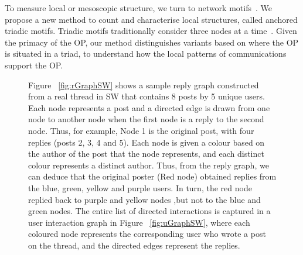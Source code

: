 To measure local or mesoscopic structure, we turn to network motifs~\cite{milo2002network}. We propose a new method to count and characterise local structures, called anchored triadic motifs. Triadic motifs traditionally consider three nodes at a time~\cite{milo2002network}. Given the primacy of the OP, our method distinguishes variants based on where the OP is situated in a triad, to understand how the local patterns of  communications support the OP.  

\begin{figure}[!h]
    \centering
\hspace{30mm}
    
    \caption{ Figure ~\ref{fig:rGraphSW} shows a sample reply graph constructed from a real thread in SW that contains 8 posts by 5 unique users. Each node represents a post and a directed edge is drawn from one node to another node when the first node is a reply to the second node. Thus, for example, Node 1 is the original post, with four replies (posts 2, 3, 4 and 5). Each node is given a colour based on the author of the post that the node represents, and each distinct colour represents a distinct author. Thus, from the reply graph, we can deduce that the original poster (Red node) obtained replies from the blue, green, yellow and purple users. In turn, the red node replied back to purple and yellow nodes ,but not to the blue and green nodes. The entire list of directed interactions is captured in a user interaction graph in Figure ~\ref{fig:uGraphSW}, where each coloured node represents the corresponding user who wrote a post on the thread, and the directed edges represent the replies.}
    \label{Fig:GraphExamples}
\end{figure}

